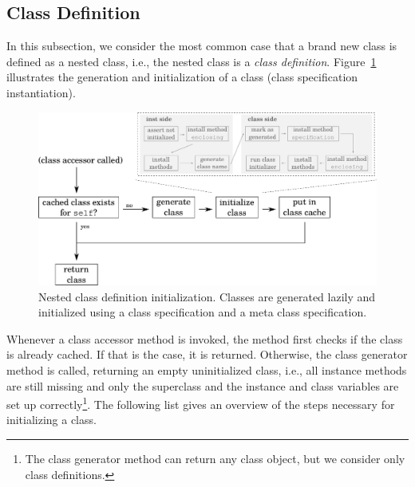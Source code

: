 \subsection{Class Definition}
In this subsection, we consider the most common case that a brand new class is defined as a nested class, i.e., the nested class is a \emph{class definition}. Figure~\ref{fig:lazy_class_gen} illustrates the generation and initialization of a class (class specification instantiation). 

\begin{figure}[!hbp]
	\includegraphics[width=\textwidth]{lazy_class_gen.pdf}
	\centering
	\caption[Nested class definition initialization]{Nested class definition initialization. Classes are generated lazily and initialized using a class specification and a meta class specification.}
	\label{fig:lazy_class_gen}
\end{figure}

Whenever a class accessor method is invoked, the method first checks if the class is already cached. If that is the case, it is returned. Otherwise, the class generator method is called, returning an empty uninitialized class, i.e., all instance methods are still missing and only the superclass and the instance and class variables are set up correctly\footnote{The class generator method can return any class object, but we consider only class definitions.}. The following list gives an overview of the steps necessary for initializing a class.

